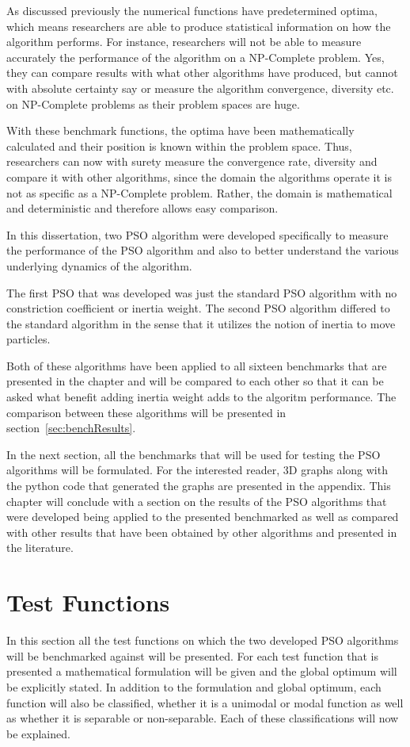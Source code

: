 As discussed previously the numerical functions have predetermined optima, which means researchers are able to produce statistical information on how the algorithm performs. For instance, researchers will not be able to measure accurately the performance of the algorithm on a NP-Complete problem\cite{CompuIntelligenceIntro,FundamentalSwarm}. Yes, they can compare results with what other algorithms have produced, but cannot with absolute certainty say or measure the algorithm convergence, diversity etc. on NP-Complete problems as their problem spaces are huge\cite{evalevoalgo}. 

With these benchmark functions, the optima have been mathematically calculated and their position is known within the problem space\cite{evalevoalgo}. Thus, researchers can now with surety measure the convergence rate, diversity and compare it with other algorithms, since the domain the algorithms operate it is not as specific as a NP-Complete problem\cite{evalevoalgo}. Rather, the domain is mathematical and deterministic and therefore allows easy comparison\cite{evalevoalgo}.

In this dissertation, two PSO algorithm were developed specifically to measure the performance of the PSO algorithm and also to better understand the various underlying dynamics of the algorithm.

The first PSO that was developed was just the standard PSO algorithm with no constriction coefficient or inertia weight. The second PSO algorithm differed to the standard algorithm in the sense that it utilizes the notion of inertia to move particles. 

Both of these algorithms have been applied to all sixteen benchmarks that are presented in the chapter and will be compared to each other so that it can be asked what benefit adding inertia weight adds to the algoritm performance. The comparison between these algorithms will be presented in section~\ref{sec:benchResults}.

In the next section, all the benchmarks that will be used for testing the PSO algorithms will be formulated. For the interested reader, 3D graphs along with the python code that generated the graphs are presented in the appendix. This chapter will conclude with a section on the results of the PSO algorithms that were developed being applied to the presented benchmarked as well as compared with other results that have been obtained by other algorithms and presented in the literature.
\section{Test Functions}
In this section all the test functions on which the two developed PSO algorithms will be benchmarked against will be presented. For each test function that is presented a mathematical formulation will be given and the global optimum will be explicitly stated. In addition to the formulation and global optimum, each function will also be classified, whether it is a unimodal or modal function as well as whether it is separable or non-separable. Each of these classifications will now be explained.

